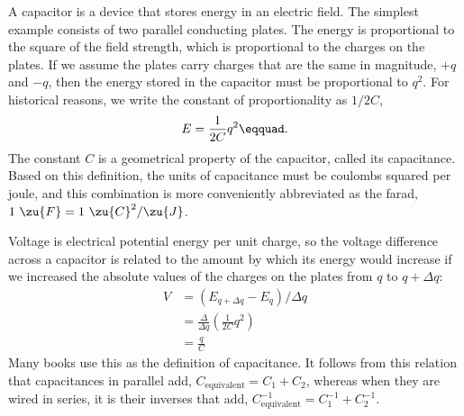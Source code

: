 A capacitor is a device that stores energy in an electric field.
The simplest example consists of two parallel conducting plates.
The energy is proportional to the square of the field
strength, which is proportional to the charges on the  
plates. If we assume the plates carry charges that are the 
same in magnitude, $+q$ and $-q$, then the energy stored in
the capacitor must be proportional to $q^2$. For historical 
reasons, we write the constant of proportionality as $1/2C$,
\begin{equation*}
                E    =   \frac{1}{2C}q^2\eqquad.
\end{equation*}
The constant $C$ is a geometrical property of the
capacitor, called its capacitance.
Based on this definition, the units of capacitance must be
coulombs squared per joule, and this combination is more
conveniently abbreviated as the farad,
$1\ \zu{F}=1\ \zu{C}^2/\zu{J}$.

Voltage is electrical potential energy per unit charge, so
the voltage difference across a 
capacitor is related to the amount by which its energy would
increase if we increased the absolute values of the charges on the plates
 from $q$ to $q+\Delta q$:
\begin{align*}
                V         &=    (E_{q+\Delta q}-E_q)/\Delta q   \\
                        &= \frac{\Delta}{\Delta q}\left(\frac{1}{2C}q^2\right) \\
                        &= \frac{q}{C} 
\end{align*}
Many books
use this as the definition of capacitance.
It follows from this relation that
capacitances in parallel add, $C_\text{equivalent}=C_1+C_2$, whereas when
they are wired in series, it is their inverses that add,
$C_\text{equivalent}^{-1}=C_1^{-1}+C_2^{-1}$.
